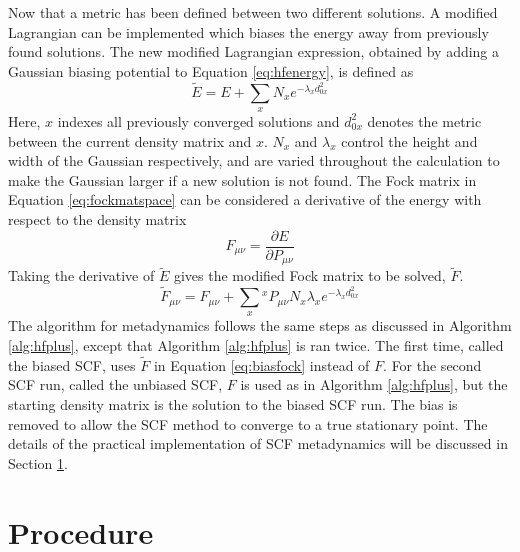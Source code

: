 \documentclass[final,3p,times,twocolumn]{elsarticle}
\begin{document}
Now that a metric has been defined between two different solutions. A modified Lagrangian can be implemented which biases the energy away from previously found solutions. The new modified Lagrangian expression, obtained by adding a Gaussian biasing potential to Equation \eqref{eq:hfenergy}, is defined as
\begin{equation} \label{eq:mdenergy}
\tilde E = E + \sum_x N_xe^{-\lambda_xd_{0x}^2}
\end{equation}
Here, $x$ indexes all previously converged solutions and $d_{0x}^2$ denotes the metric between the current density matrix and $x$. $N_x$ and $\lambda_x$ control the height and width of the Gaussian respectively, and are varied throughout the calculation to make the Gaussian larger if a new solution is not found. The Fock matrix in Equation \eqref{eq:fockmatspace} can be considered a derivative of the energy with respect to the density matrix
\begin{equation}
F_{\mu\nu} = \frac{\partial E}{\partial P_{\mu\nu}}
\end{equation}
Taking the derivative of $\tilde E$ gives the modified Fock matrix to be solved, $\tilde F$.
\begin{equation} \label{eq:biasfock}
\tilde F_{\mu\nu} = F_{\mu\nu} + \sum_x{}^xP_{\mu\nu}N_x\lambda_x e^{-\lambda_x d_{0x}^2}
\end{equation}
The algorithm for metadynamics follows the same steps as discussed in Algorithm \ref{alg:hfplus}, except that Algorithm \ref{alg:hfplus} is ran twice. The first time, called the biased SCF, uses $\tilde F$ in Equation \eqref{eq:biasfock} instead of $F$. For the second SCF run, called the unbiased SCF, $F$ is used as in Algorithm \ref{alg:hfplus}, but the starting density matrix is the solution to the biased SCF run. The bias is removed to allow the SCF method to converge to a true stationary point. The details of the practical implementation of SCF metadynamics will be discussed in Section \ref{sec:scfmdalg}.

\section{Procedure}\label{sec:scfmdalg}
\end{document}
